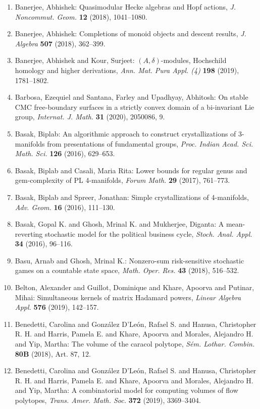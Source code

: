 \begin{enumerate}
\item Banerjee, Abhishek: Quasimodular {H}ecke algebras and {H}opf actions, \emph{J. Noncommut. Geom.} {\bf 12} (2018), 1041--1080.
\item Banerjee, Abhishek: Completions of monoid objects and descent results, \emph{J. Algebra} {\bf 507} (2018), 362--399.
\item Banerjee, Abhishek and Kour, Surjeet: {$(A,\delta)$}-modules, {H}ochschild homology and higher
derivations, \emph{Ann. Mat. Pura Appl. (4)} {\bf 198} (2019), 1781--1802.
\item Barbosa, Ezequiel and Santana, Farley and Upadhyay, Abhitosh: On stable {CMC} free-boundary surfaces in a strictly convex
domain of a bi-invariant {L}ie group, \emph{Internat. J. Math.} {\bf 31} (2020), 2050086, 9.
\item Basak, Biplab: An algorithmic approach to construct crystallizations of
3-manifolds from presentations of fundamental groups, \emph{Proc. Indian Acad. Sci. Math. Sci.} {\bf 126} (2016), 629--653.
\item Basak, Biplab and Casali, Maria Rita: Lower bounds for regular genus and gem-complexity of {PL}
4-manifolds, \emph{Forum Math.} {\bf 29} (2017), 761--773.
\item Basak, Biplab and Spreer, Jonathan: Simple crystallizations of 4-manifolds, \emph{Adv. Geom.} {\bf 16} (2016), 111--130.
\item Basak, Gopal K. and Ghosh, Mrinal K. and Mukherjee, Diganta: A mean-reverting stochastic model for the political business
cycle, \emph{Stoch. Anal. Appl.} {\bf 34} (2016), 96--116.
\item Basu, Arnab and Ghosh, Mrinal K.: Nonzero-sum risk-sensitive stochastic games on a countable
state space, \emph{Math. Oper. Res.} {\bf 43} (2018), 516--532.
\item Belton, Alexander and Guillot, Dominique and Khare, Apoorva
and Putinar, Mihai: Simultaneous kernels of matrix {H}adamard powers, \emph{Linear Algebra Appl.} {\bf 576} (2019), 142--157.
\item Benedetti, Carolina and Gonz\'{a}lez D'Le\'{o}n, Rafael S. and Hanusa,
Christopher R. H. and Harris, Pamela E. and Khare, Apoorva and
Morales, Alejandro H. and Yip, Martha: The volume of the caracol polytope, \emph{S\'{e}m. Lothar. Combin.} {\bf 80B} (2018), Art. 87, 12.
\item Benedetti, Carolina and Gonz\'{a}lez D'Le\'{o}n, Rafael S. and Hanusa,
Christopher R. H. and Harris, Pamela E. and Khare, Apoorva and
Morales, Alejandro H. and Yip, Martha: A combinatorial model for computing volumes of flow polytopes, \emph{Trans. Amer. Math. Soc.} {\bf 372} (2019), 3369--3404.

\end{enumerate}
